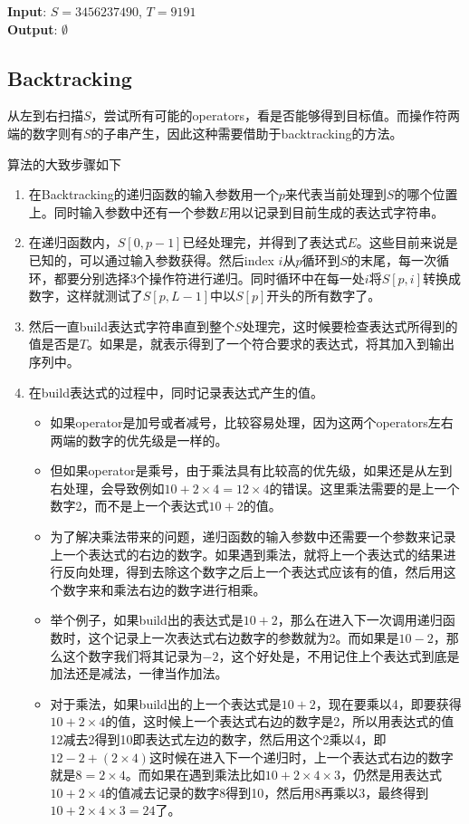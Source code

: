 \begin{flushleft}
\textbf{Input}: $S = 3456237490$, $T = 9191$
\\
\textbf{Output}: $\emptyset$
\end{flushleft}
\subsection{Backtracking}
从左到右扫描$S$，尝试所有可能的operators，看是否能够得到目标值。而操作符两端的数字则有$S$的子串产生，因此这种需要借助于backtracking的方法。
\par
算法的大致步骤如下
\begin{enumerate}
\item 在Backtracking的递归函数的输入参数用一个$p$来代表当前处理到$S$的哪个位置上。同时输入参数中还有一个参数$E$用以记录到目前生成的表达式字符串。
\item 在递归函数内，$S[0,p-1]$已经处理完，并得到了表达式$E$。这些目前来说是已知的，可以通过输入参数获得。然后index $i$从$p$循环到$S$的末尾，每一次循环，都要分别选择3个操作符进行递归。同时循环中在每一处$i$将$S[p,i]$转换成数字，这样就测试了$S[p, L-1]$中以$S[p]$开头的所有数字了。
\item 然后一直build表达式字符串直到整个$S$处理完，这时候要检查表达式所得到的值是否是$T$。如果是，就表示得到了一个符合要求的表达式，将其加入到输出序列中。
\item 在build表达式的过程中，同时记录表达式产生的值。
\begin{itemize}
\item 如果operator是加号或者减号，比较容易处理，因为这两个operators左右两端的数字的优先级是一样的。
\item 但如果operator是乘号，由于乘法具有比较高的优先级，如果还是从左到右处理，会导致例如$10+2\times4=12\times4$的错误。这里乘法需要的是上一个数字2，而不是上一个表达式$10+2$的值。
\item 为了解决乘法带来的问题，递归函数的输入参数中还需要一个参数来记录上一个表达式的右边的数字。如果遇到乘法，就将上一个表达式的结果进行反向处理，得到去除这个数字之后上一个表达式应该有的值，然后用这个数字来和乘法右边的数字进行相乘。
\item 举个例子，如果build出的表达式是$10+2$，那么在进入下一次调用递归函数时，这个记录上一次表达式右边数字的参数就为2。而如果是$10-2$，那么这个数字我们将其记录为$-2$，这个好处是，不用记住上个表达式到底是加法还是减法，一律当作加法。
\item 对于乘法，如果build出的上一个表达式是$10+2$，现在要乘以4，即要获得$10+2\times 4$的值，这时候上一个表达式右边的数字是2，所以用表达式的值12减去2得到10即表达式左边的数字，然后用这个2乘以4，即$12-2+(2\times 4)$这时候在进入下一个递归时，上一个表达式右边的数字就是$8=2\times 4$。而如果在遇到乘法比如$10+2\times4\times3$，仍然是用表达式$10+2\times4$的值减去记录的数字8得到10，然后用8再乘以3，最终得到$10+2\times4\times3=24$了。
\end{itemize}
\end{enumerate}
